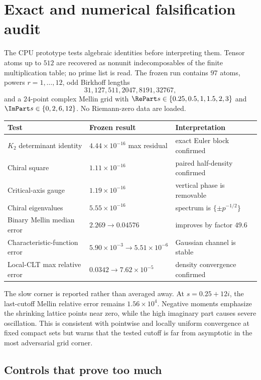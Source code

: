 \section{Exact and numerical falsification audit}
\label{sec:experiment}

The CPU prototype tests algebraic identities before interpreting them. Tensor
atoms up to $512$ are recovered as nonunit indecomposables of the finite
multiplication table; no prime list is read. The frozen run contains $97$
atoms, powers $r=1,\ldots,12$, odd Birkhoff lengths
\[
 31,127,511,2047,8191,32767,
\]
and a $24$-point complex Mellin grid with
$\RePart s\in\{0.25,0.5,1,1.5,2,3\}$ and
$\ImPart s\in\{0,2,6,12\}$. No Riemann-zero data are loaded.

\begin{center}
\small
\begin{tabularx}{0.97\textwidth}{L{0.31\textwidth}L{0.19\textwidth}X}
\toprule
Test & Frozen result & Interpretation \\
\midrule
$K_2$ determinant identity & $4.44\times10^{-16}$ max residual & exact Euler block confirmed \\
Chiral square & $1.11\times10^{-16}$ & paired half-density confirmed \\
Critical-axis gauge & $1.19\times10^{-16}$ & vertical phase is removable \\
Chiral eigenvalues & $5.55\times10^{-16}$ & spectrum is $\{\pm p^{-1/2}\}$ \\
Binary Mellin median error & $2.269\to0.04576$ & improves by factor $49.6$ \\
Characteristic-function error & $5.90\times10^{-3}\to5.51\times10^{-6}$ & Gaussian channel is stable \\
Local-CLT max relative error & $0.0342\to7.62\times10^{-5}$ & density convergence confirmed \\
\bottomrule
\end{tabularx}
\end{center}

The slow corner is reported rather than averaged away. At
$s=0.25+12i$, the last-cutoff Mellin relative error remains
$1.56\times10^4$. Negative moments emphasize the shrinking lattice points
near zero, while the high imaginary part causes severe oscillation. This is
consistent with pointwise and locally uniform convergence at fixed compact
sets but warns that the tested cutoff is far from asymptotic in the most
adversarial grid corner.

\subsection{Controls that prove too much}

